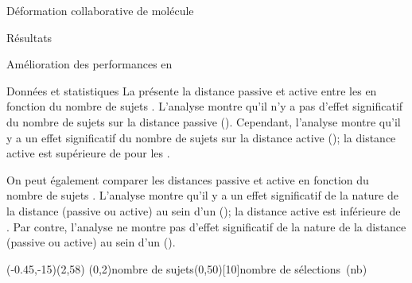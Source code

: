 \documentclass[myfrancais,ngerman,english,french]{mythesis}
\begin{document}
\begin{mychapter}{Déformation collaborative de molécule}
\begin{mysection}{Résultats}
\begin{mysubsection}{Amélioration des performances en }
\begin{mysubsubsection}{Données et statistiques}
					La  présente la distance passive  et active  entre les  en fonction du nombre de sujets .
					L'analyse montre qu'il n'y a pas d'effet significatif du nombre de sujets  sur la distance passive  ().
					Cependant, l'analyse montre qu'il y a un effet significatif du nombre de sujets  sur la distance active  (); la distance active est supérieure de  pour les .

					On peut également comparer les distances passive et active en fonction du nombre de sujets .
					L'analyse montre qu'il y a un effet significatif de la nature de la distance (passive ou active) au sein d'un  (); la distance active est inférieure de .
					Par contre, l'analyse ne montre pas d'effet significatif de la nature de la distance (passive ou active) au sein d'un  ().

					\begin{myfigure}
						\begin{myps}(-0.45,-15)(2,58)
							\myaxes(0,2){nombre de sujets}(0,50)[10]{nombre de sélections~(nb)}
						\end{myps}
					\end{myfigure}


\end{mysubsubsection}
\end{mysubsection}
\end{mysection}
\end{mychapter}
\end{document}
